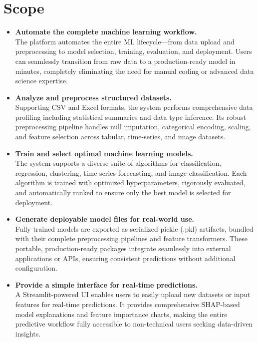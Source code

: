 \newpage
\section{Scope}
\begin{itemize}
\item \textbf{Automate the complete machine learning workflow.}\\
The platform automates the entire ML lifecycle—from data upload and preprocessing to model selection, training, evaluation, and deployment. Users can seamlessly transition from raw data to a production-ready model in minutes, completely eliminating the need for manual coding or advanced data science expertise.\vspace{0.15cm}

\item \textbf{Analyze and preprocess structured datasets.}\\
Supporting CSV and Excel formats, the system performs comprehensive data profiling including statistical summaries and data type inference. Its robust preprocessing pipeline handles null imputation, categorical encoding, scaling, and feature selection across tabular, time-series, and image datasets.\vspace{0.15cm}

\item \textbf{Train and select optimal machine learning models.}\\
The system supports a diverse suite of algorithms for classification, regression, clustering, time-series forecasting, and image classification. Each algorithm is trained with optimized hyperparameters, rigorously evaluated, and automatically ranked to ensure only the best model is selected for deployment.\vspace{0.15cm}

\item \textbf{Generate deployable model files for real-world use.}\\
Fully trained models are exported as serialized pickle (.pkl) artifacts, bundled with their complete preprocessing pipelines and feature transformers. These portable, production-ready packages integrate seamlessly into external applications or APIs, ensuring consistent predictions without additional configuration.\vspace{0.15cm}

\item \textbf{Provide a simple interface for real-time predictions.}\\
A Streamlit-powered UI enables users to easily upload new datasets or input features for real-time predictions. It provides comprehensive SHAP-based model explanations and feature importance charts, making the entire predictive workflow fully accessible to non-technical users seeking data-driven insights.
\end{itemize}


